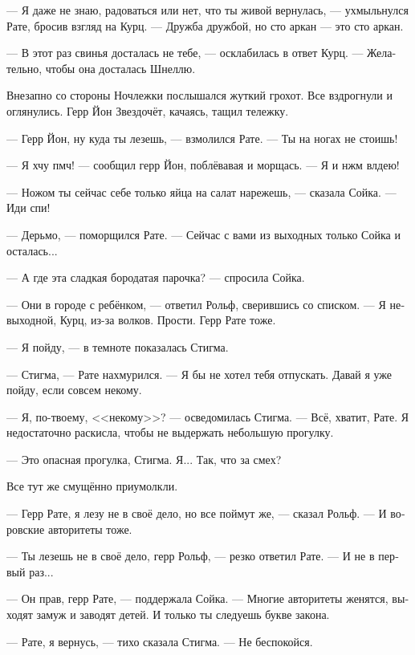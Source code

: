 \documentclass[a4paper,12pt,fleqn]{book}\usepackage{polyglossia}\setdefaultlanguage[babelshorthands=true]{russian}\setotherlanguage{english}\defaultfontfeatures{Ligatures=TeX,Mapping=tex-text}\usepackage{xcolor}\newcommand{\ml}[3]{#2}
\begin{document}
--- Я даже не знаю, радоваться или нет, что ты живой вернулась, --- ухмыльнулся Рате, бросив взгляд на Курц.
--- Дружба дружбой, но сто аркан --- это сто аркан.

--- В этот раз свинья досталась не тебе, --- осклабилась в ответ Курц.
--- Желательно, чтобы она досталась Шнеллю.

Внезапно со стороны Ночлежки послышался жуткий грохот.
Все вздрогнули и оглянулись.
Герр Йон Звездочёт, качаясь, тащил тележку.

--- Герр Йон, ну куда ты лезешь, --- взмолился Рате.
--- Ты на ногах не стоишь!

--- Я хчу пмч! --- сообщил герр Йон, поблёвавая и морщась.
--- Я и нжм влдею!

--- Ножом ты сейчас себе только яйца на салат нарежешь, --- сказала Сойка.
--- Иди спи!

--- Дерьмо, --- поморщился Рате.
--- Сейчас с вами из выходных только Сойка и осталась...

--- А где эта сладкая бородатая парочка? --- спросила Сойка.

--- Они в городе с ребёнком, --- ответил Рольф, сверившись со списком.
--- Я невыходной, Курц, из-за волков.
Прости.
Герр Рате тоже.

--- Я пойду, --- в темноте показалась Стигма.

--- Стигма, --- Рате нахмурился.
--- Я бы не хотел тебя отпускать.
\ml{$0$}
{Давай я уже пойду, если совсем некому.}
{Let me go, if no one else can.''}

\ml{$0$}
{--- Я, по-твоему, <<некому>>? --- осведомилась Стигма.}
{``I am, you say, `no one else'?'' Stigma coldly asked.}
\ml{$0$}
{--- Всё, хватит, Рате.}
{``Stop that shit, Rate.}
\ml{$0$}
{Я недостаточно раскисла, чтобы не выдержать небольшую прогулку.}
{I'm definitely not bad enough to fail a little walk.''}

--- Это опасная прогулка, Стигма.
Я...
Так, что за смех?

Все тут же смущённо приумолкли.

--- Герр Рате, я лезу не в своё дело, но все поймут же, --- сказал Рольф.
--- И воровские авторитеты тоже.

--- Ты лезешь не в своё дело, герр Рольф, --- резко ответил Рате.
--- И не в первый раз...

--- Он прав, герр Рате, --- поддержала Сойка.
--- Многие авторитеты женятся, выходят замуж и заводят детей.
И только ты следуешь букве закона.

--- Рате, я вернусь, --- тихо сказала Стигма.
--- Не беспокойся.
\end{document}
